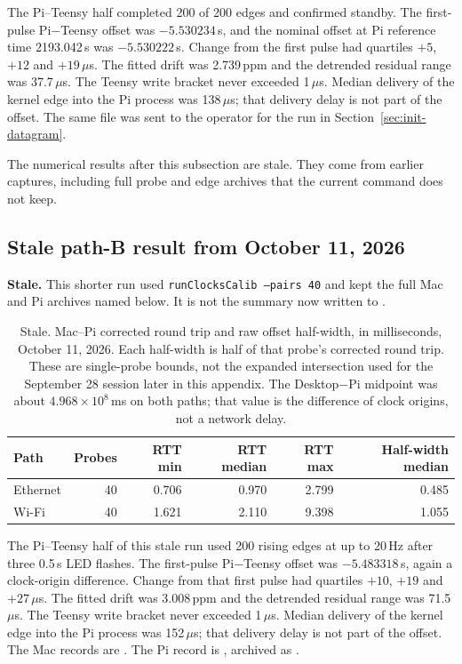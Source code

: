 The Pi--Teensy half completed 200 of 200 edges and confirmed standby. The first-pulse Pi$-$Teensy offset was $-5.530234$\,s, and the nominal offset at Pi reference time 2193.042\,s was $-5.530222$\,s. Change from the first pulse had quartiles $+5$, $+12$ and $+19$\,$\mu$s. The fitted drift was 2.739\,ppm and the detrended residual range was 37.7\,$\mu$s. The Teensy write bracket never exceeded 1\,$\mu$s. Median delivery of the kernel edge into the Pi process was 138\,$\mu$s; that delivery delay is not part of the offset. The same file was sent to the operator for the run in Section~\ref{sec:init-datagram}.

The numerical results after this subsection are stale. They come from earlier captures, including full probe and edge archives that the current command does not keep.

\subsection{Stale path-B result from October 11, 2026}
\label{sec:clock-delay-20261011}
\textbf{Stale.} This shorter run used \texttt{runClocksCalib --pairs 40} and kept the full Mac and Pi archives named below. It is not the summary now written to .

\begin{table}[H]
\centering
\caption{Stale. Mac--Pi corrected round trip and raw offset half-width, in milliseconds, October 11, 2026. Each half-width is half of that probe's corrected round trip. These are single-probe bounds, not the expanded intersection used for the September 28 session later in this appendix. The Desktop$-$Pi midpoint was about $4.968\times 10^{8}$\,ms on both paths; that value is the difference of clock origins, not a network delay.}
\label{tab:clock-delay-20261011}
\begin{tabular}{lrrrrr}
\toprule
Path & Probes & RTT min & RTT median & RTT max & Half-width median \\
\midrule
Ethernet & 40 & 0.706 & 0.970 & 2.799 & 0.485 \\
Wi-Fi & 40 & 1.621 & 2.110 & 9.398 & 1.055 \\
\bottomrule
\end{tabular}
\end{table}

The Pi--Teensy half of this stale run used 200 rising edges at up to 20\,Hz after three 0.5\,s LED flashes. The first-pulse Pi$-$Teensy offset was $-5.483318$\,s, again a clock-origin difference. Change from that first pulse had quartiles $+10$, $+19$ and $+27$\,$\mu$s. The fitted drift was 3.008\,ppm and the detrended residual range was 71.5\,$\mu$s. The Teensy write bracket never exceeded 1\,$\mu$s. Median delivery of the kernel edge into the Pi process was 152\,$\mu$s; that delivery delay is not part of the offset. The Mac records are . The Pi record is , archived as .

